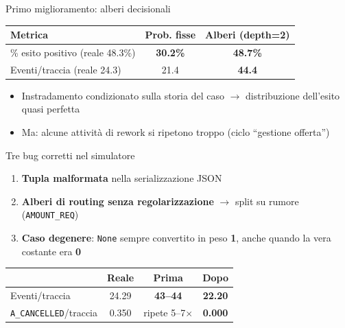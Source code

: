 \documentclass[11pt,aspectratio=169]{beamer}
\newcommand{\good}[1]{\textcolor{goodcol}{\textbf{#1}}}
\newcommand{\warncell}[1]{\textcolor{warncol}{\textbf{#1}}}
\newcommand{\badcell}[1]{\textcolor{badcol}{\textbf{#1}}}
\begin{document}
\begin{frame}{Primo miglioramento: alberi decisionali}
\begin{center}
\begin{tabular}{lcc}
\toprule
\textbf{Metrica} & \textbf{Prob. fisse} & \textbf{Alberi (depth=2)} \\
\midrule
\% esito positivo (reale 48.3\%) & \warncell{30.2\%} & \good{48.7\%} \\
Eventi/traccia (reale 24.3) & 21.4 & \badcell{44.4} \\
\bottomrule
\end{tabular}
\end{center}
\vspace{1em}
\begin{itemize}
\item Instradamento condizionato sulla storia del caso $\to$ distribuzione dell'esito quasi perfetta
\item Ma: alcune attivit\`a di rework si ripetono troppo (ciclo ``gestione offerta'')
\end{itemize}
\end{frame}

\begin{frame}{Tre bug corretti nel simulatore}
\begin{enumerate}
\item \textbf{Tupla malformata} nella serializzazione JSON
\item \textbf{Alberi di routing senza regolarizzazione} $\to$ split su rumore (\texttt{AMOUNT\_REQ})
\item \textbf{Caso degenere}: \texttt{None} sempre convertito in peso \textbf{1}, anche quando la vera costante era \textbf{0}
\end{enumerate}
\vspace{1em}
\begin{center}
\begin{tabular}{lccc}
\toprule
& \textbf{Reale} & \textbf{Prima} & \textbf{Dopo} \\
\midrule
Eventi/traccia & 24.29 & \warncell{43--44} & \good{22.20} \\
\texttt{A\_CANCELLED}/traccia & 0.350 & ripete 5--7$\times$ & \badcell{0.000} \\
\bottomrule
\end{tabular}
\end{center}
\end{frame}
\end{document}
